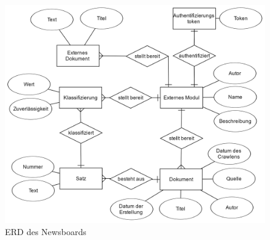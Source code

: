 \begin{figure}[h]
	\centering 
	\includegraphics[scale=0.175]{content/erd.png}
	\caption{ERD des Newsboards}
	\label{fig:erd}
\end{figure}

